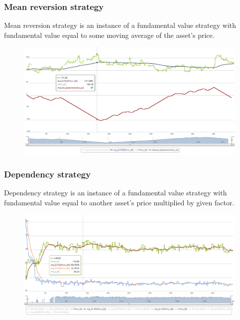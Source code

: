 \documentclass{beamer}
\begin{document}
\begin{frame}
\frametitle{Mean reversion strategy}
Mean reversion strategy is an instance of a fundamental value strategy with fundamental value equal to some moving average of the asset's price.
\begin{figure}[htbp]
\centering
\includegraphics[width=1\linewidth]{meanreversion.png}
\end{figure}
\end{frame}

\begin{frame}
\frametitle{Dependency strategy}
Dependency strategy is an instance of a fundamental value strategy with fundamental value equal to another asset's price multiplied by given factor.
\begin{figure}[htbp]
\centering
\includegraphics[width=1\linewidth]{dependency.png}
\end{figure}
\end{frame}
\end{document}
